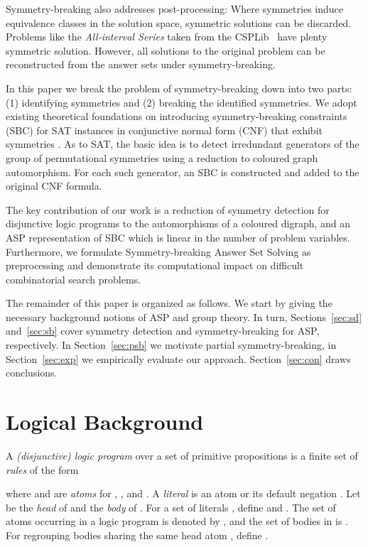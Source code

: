 \documentclass[envcountsame]{llncs}
\begin{document}
Symmetry-breaking also addresses post-processing: Where symmetries induce equivalence classes in the solution space, symmetric solutions can be discarded. Problems like the \emph{All-interval Series} taken from the CSPLib~\cite{gewa99a} have plenty symmetric solution. However, all solutions to the original problem can be reconstructed from the answer sets under symmetry-breaking.

In this paper we break the problem of symmetry-breaking down into two parts: (1) identifying symmetries and (2) breaking the identified
symmetries. We adopt existing theoretical foundations on introducing sym\-me\-try-breaking constraints (SBC) for SAT instances in conjunctive normal form (CNF) that exhibit symmetries \cite{crgiluro96a,almasa03a,alramasa03a,sa09a}. As to SAT, the basic idea is to detect irredundant generators of the group of permutational symmetries using a reduction to coloured graph automorphism. For each such generator, an SBC is constructed and added to the original CNF formula.

The key contribution of our work is a reduction of symmetry detection for disjunctive logic programs to the automorphisms of a coloured digraph, and an ASP representation of SBC which is linear in the number of problem variables. Furthermore, we formulate Symmetry-breaking Answer Set Solving as preprocessing and demonstrate its computational impact on difficult combinatorial search problems.

The remainder of this paper is organized as follows. We start by giving the necessary background notions of ASP and group theory. In turn, Sections~\ref{sec:sd} and~\ref{sec:sb} cover symmetry detection and symmetry-breaking for ASP, respectively. In Section~\ref{sec:psb} we motivate partial symmetry-breaking, in Section~\ref{sec:exp} we empirically evaluate our approach. Section~\ref{sec:con} draws conclusions.

\section{Logical Background}
A \emph{(disjunctive) logic program} over a set of primitive propositions  is a finite set of \emph{rules}  of the form

where and  are \emph{atoms} for , , and .
A \emph{literal} is an atom  or its default negation .
Let  be the \emph{head} of  and  the \emph{body} of . For a set of literals , define  and . The set of atoms occurring in a logic program  is denoted by , and the set of bodies in  is . For regrouping bodies sharing the same head atom , define .
\end{document}
